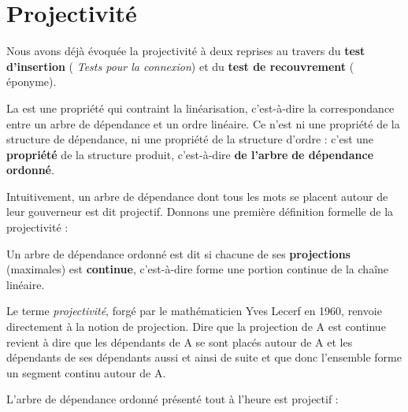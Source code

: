 \section{Projectivité}\label{sec:3.5.14}

Nous avons déjà évoquée la projectivité à deux reprises au travers du \textbf{test d’insertion} ( \textit{Tests pour la connexion}) et du \textbf{test de recouvrement} ( éponyme).

La  est une propriété qui contraint la linéarisation, c’est-à-dire la correspondance entre un arbre de dépendance et un ordre linéaire. Ce n’est ni une propriété de la structure de dépendance, ni une propriété de la structure d’ordre : c’est une \textbf{propriété} de la structure produit, c’est-à-dire \textbf{de l’arbre} \textbf{de dépendance ordonné}.

Intuitivement, un arbre de dépendance dont tous les mots se placent autour de leur gouverneur est dit projectif. Donnons une première définition formelle de la projectivité :

\begin{styleLivreImportant}
Un arbre de dépendance ordonné est dit  si chacune de ses \textbf{projections} (maximales) est \textbf{continue}, c’est-à-dire forme une portion continue de la chaîne linéaire.
\end{styleLivreImportant}

Le terme \textit{projectivité}, forgé par le mathématicien Yves Lecerf en 1960, renvoie directement à la notion de projection. Dire que la projection de A est continue revient à dire que les dépendants de A se sont placés autour de A et les dépendants de ses dépendants aussi et ainsi de suite et que donc l’ensemble forme un segment continu autour de A.

L’arbre de dépendance ordonné présenté tout à l’heure est projectif :

